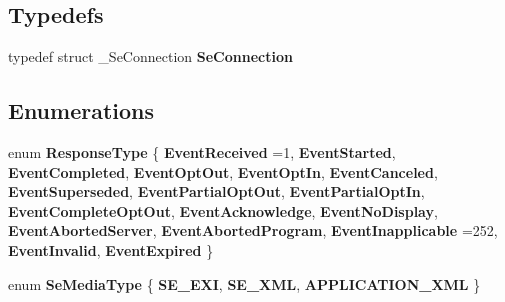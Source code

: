 \subsection*{Typedefs}
\begin{DoxyCompactItemize}
\item 
\mbox{\label{group__se__connection_gaf11d1431bb63b6aa4d92e8291efb6509}} 
typedef struct \+\_\+\+Se\+Connection {\bfseries Se\+Connection}
\end{DoxyCompactItemize}
\subsection*{Enumerations}
\begin{DoxyCompactItemize}
\item 
\mbox{\label{group__se__connection_gaf5055605e320b3f9ea9fa330b57604e7}} 
enum {\bfseries Response\+Type} \{ \newline
{\bfseries Event\+Received} =1, 
\newline
{\bfseries Event\+Started}, 
\newline
{\bfseries Event\+Completed}, 
\newline
{\bfseries Event\+Opt\+Out}, 
\newline
{\bfseries Event\+Opt\+In}, 
\newline
{\bfseries Event\+Canceled}, 
\newline
{\bfseries Event\+Superseded}, 
\newline
{\bfseries Event\+Partial\+Opt\+Out}, 
\newline
{\bfseries Event\+Partial\+Opt\+In}, 
\newline
{\bfseries Event\+Complete\+Opt\+Out}, 
\newline
{\bfseries Event\+Acknowledge}, 
\newline
{\bfseries Event\+No\+Display}, 
\newline
{\bfseries Event\+Aborted\+Server}, 
\newline
{\bfseries Event\+Aborted\+Program}, 
\newline
{\bfseries Event\+Inapplicable} =252, 
\newline
{\bfseries Event\+Invalid}, 
\newline
{\bfseries Event\+Expired}
 \}
\item 
\mbox{\label{group__se__connection_ga3d348876b4715f38655df6f90291300e}} 
enum {\bfseries Se\+Media\+Type} \{ \newline
{\bfseries S\+E\+\_\+\+E\+XI}, 
\newline
{\bfseries S\+E\+\_\+\+X\+ML}, 
\newline
{\bfseries A\+P\+P\+L\+I\+C\+A\+T\+I\+O\+N\+\_\+\+X\+ML}
 \}
\end{DoxyCompactItemize}
